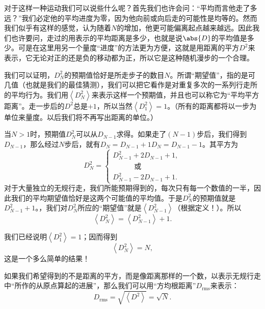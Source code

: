 对于这样一种运动我们可以说些什么呢？首先我们也许会问：“平均而言他走了多远？”我们必定他的平均进度为零，因为他向前或向后走的可能性是均等的。然而我们似乎有这样的感觉，认为随着$N$的增加，他更可能偏离起点越来越远。因此我们也许要问，走过的用表示的平均距离是多少，也就是说$\abs{D}$的平均值是多少。可是在这里用另一个量度“进度”的方法更为方便，这就是用距离的平方$D^2$来表示，它无论对正的还是负的移动都为正，所以它是这种随机漫步的一个合理。

我们可以证明，$D_N^2$的预期值恰好是所走步子的数目$N$。所谓“期望值”，指的是可几值（也就是我们的最佳猜测），我们可以把它看作是对重复多次的一系列行走所的平均行为。我们用$\left <D_N^2 \right >$来表示这样一个预期值，并且也可以称它为“平均平方距离”。走一步后的$D^2$总是$+1$，所以当然$\left < D_1^2 \right >=1$。（所有的距离都将以一步为单位来量度。以后我们将不再写出距离的单位。）

当$N>1$时，预期值$D_N^2$可以从$D_{N-1}$求得。如果走了$(N-1)$步后，我们得到$D_{N-1}$，那么经过$N$步后，就有$D_N=D_{N-1}+1$$D_N=D_{N-1}-1$。其平方为
\begin{equation}
\label{Eq:I:6:7}
D_N^2=
\begin{cases}
D_{N-1}^2+2D_{N-1}+1,\\[2ex]
\quad\qquad\textit{或}\\[2ex]
D_{N-1}^2-2D_{N-1}+1.
\end{cases}
\end{equation}
对于大量独立的无规行走，我们所能预期得到的，每次只有每一个数值的一半，因此我们的平均期望值恰好是这两个可能值的平均值。于是$D_N^2$的预期值就是$D_{N-1}^2+1$。，我们对$D_N^2$所应的“期望值”就是$\left <D_{N-1}^2 \right >$（根据定义！）。所以
\begin{equation}
\label{Eq:I:6:8}
\left < D_N^2 \right >=\left < D_{N-1}^2 \right >+1.
\end{equation}

我们已经说明$\left < D_1^2 \right > = 1$；因而得到
\begin{equation}
\label{Eq:I:6:9}
\left < D_N^2 \right > =N,
\end{equation} 
这是一个多么简单的结果！

如果我们希望得到的不是距离的平方，而是像距离那样的一个数，以表示无规行走中“所作的从原点算起的进展”，那么我们可以用“方均根距离”$D_{\text{rms}}$来表示：
\begin{equation}
\label{Eq:I:6:10}
D_{\text{rms}}=\sqrt{\left < D^2 \right > }=\sqrt{N}.
\end{equation}

